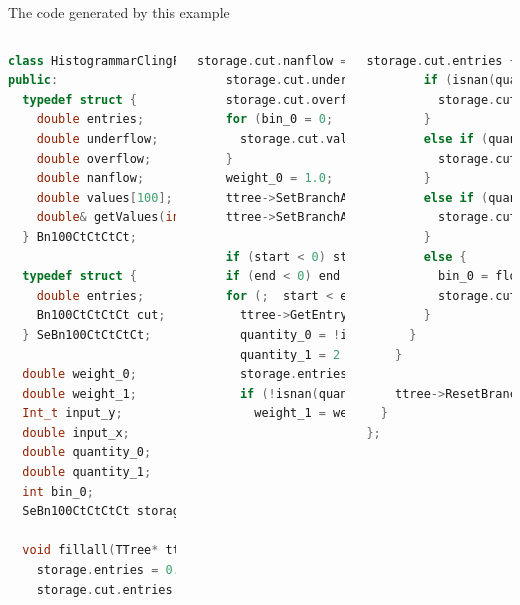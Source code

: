 \documentclass{beamer}
\begin{document}
\begin{frame}[fragile]{}
\vspace{1 cm}

\Large The code generated by this example

\vspace{0.25 cm}
\begin{columns}
\begin{lstlisting}[language=cpp, basicstyle=\ttfamily\fontsize{5}{4}\selectfont]
class HistogrammarClingFiller_0 {
public:
  typedef struct {
    double entries;
    double underflow;
    double overflow;
    double nanflow;
    double values[100];
    double& getValues(int i) { return values[i]; }
  } Bn100CtCtCtCt;

  typedef struct {
    double entries;
    Bn100CtCtCtCt cut;
  } SeBn100CtCtCtCt;

  double weight_0;
  double weight_1;
  Int_t input_y;
  double input_x;
  double quantity_0;
  double quantity_1;
  int bin_0;
  SeBn100CtCtCtCt storage;

  void fillall(TTree* ttree, Long64_t start, Long64_t end) {
    storage.entries = 0.0;
    storage.cut.entries = 0.0;
\end{lstlisting}

\begin{lstlisting}[language=cpp, basicstyle=\ttfamily\fontsize{5}{4}\selectfont]
    storage.cut.nanflow = 0.0;
    storage.cut.underflow = 0.0;
    storage.cut.overflow = 0.0;
    for (bin_0 = 0;  bin_0 < 100;  ++bin_0) {
      storage.cut.values[bin_0] = 0.0;
    }
    weight_0 = 1.0;
    ttree->SetBranchAddress("x", &input_x);
    ttree->SetBranchAddress("y", &input_y);

    if (start < 0) start = 0;
    if (end < 0) end = ttree->GetEntries();
    for (;  start < end;  ++start) {
      ttree->GetEntry(start);
      quantity_0 = !input_y;
      quantity_1 = 2 * input_x;
      storage.entries += weight_0;
      if (!isnan(quantity_0)  &&  quantity_0 > 0.0) {
        weight_1 = weight_0 * quantity_0;
\end{lstlisting}

\begin{lstlisting}[language=cpp, basicstyle=\ttfamily\fontsize{5}{4}\selectfont]
        storage.cut.entries += weight_1;
        if (isnan(quantity_1)) {
          storage.cut.nanflow += weight_1;
        }
        else if (quantity_1 < -10.0) {
          storage.cut.underflow += weight_1;
        }
        else if (quantity_1 >= 10.0) {
          storage.cut.overflow += weight_1;
        }
        else {
          bin_0 = floor((quantity_1 - -10.0) * 5.0);
          storage.cut.values[bin_0] += weight_1;
        }
      }
    }

    ttree->ResetBranchAddresses();
  }
};
\end{lstlisting}
\end{columns}
\end{frame}
\end{document}
